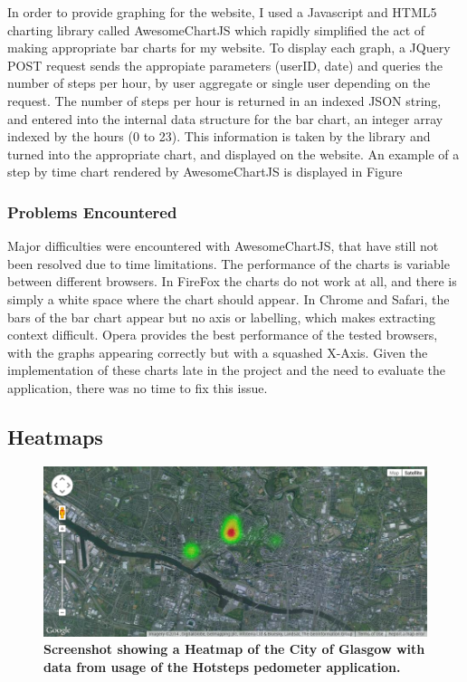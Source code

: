\documentclass{l4proj}
\begin{document}
In order to provide graphing for the website, I used a Javascript and HTML5 charting library called AwesomeChartJS which rapidly simplified the act of making appropriate bar charts for my website. To display each graph, a JQuery POST request sends the appropiate parameters (userID, date) and queries the number of steps per hour, by user aggregate or single user depending on the request. The number of steps per hour is returned in an indexed JSON string, and entered into the internal data structure for the bar chart, an integer array indexed by the hours (0 to 23). This information is taken by the library and turned into the appropriate chart, and displayed on the website. An example of a step by time chart rendered by AwesomeChartJS is displayed in Figure 

\subsubsection{Problems Encountered}

Major difficulties were encountered with AwesomeChartJS, that have still not been resolved due to time limitations. The performance of the charts is variable between different browsers. In FireFox the charts do not work at all, and there is simply a white space where the chart should appear. In Chrome and Safari, the bars of the bar chart appear but no axis or labelling, which makes extracting context difficult. Opera provides the best performance of the tested browsers, with the graphs appearing correctly but with a squashed X-Axis. Given the implementation of these charts late in the project and the need to evaluate the application, there was no time to fix this issue.

\subsection{Heatmaps}

\begin{figure}[ht!]
\centering
\includegraphics[scale=0.5]{images/screenshots/heatmapscreen.png}
\caption{\textbf{Screenshot showing a Heatmap of the City of Glasgow with data from usage of the Hotsteps pedometer application.}}
\label{impl:heatmapscreen}
\end{figure}
\end{document}
